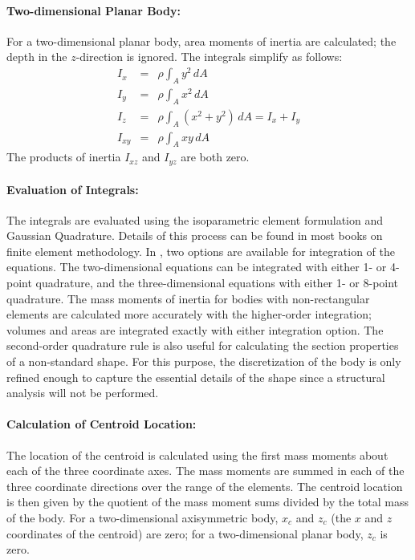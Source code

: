 \paragraph{Two-dimensional Planar Body:}
For a two-dimensional planar body, area moments of inertia are
calculated; the depth in the $z$-direction is ignored. The integrals
simplify as follows:
\begin{eqnarray}
 I_x    &=& \rho\int_A y^2\,dA                   \\
 I_y    &=& \rho\int_A x^2\,dA                   \\
 I_z    &=& \rho\int_A \left(x^2 + y^2\right)\,dA = I_x + I_y \\
 I_{xy} &=& \rho\int_A xy\,dA
\end{eqnarray}
The products of inertia $I_{xz}$ and $I_{yz}$ are both zero.

\paragraph*{Evaluation of Integrals:} The integrals are evaluated using
the isoparametric element formulation and Gaussian Quadrature. Details
of this process can be found in most books on finite element
methodology.  In \numbers, two options are available for integration of
the equations.  The two-dimensional equations can be integrated with
either 1- or 4-point quadrature, and the three-dimensional equations
with either 1- or 8-point quadrature.  The mass moments of inertia for
bodies with non-rectangular elements are calculated more accurately with
the higher-order integration; volumes and areas are integrated exactly
with either integration option.  The second-order quadrature rule is
also useful for calculating the section properties of a non-standard
shape.  For this purpose, the discretization of the body is only refined
enough to capture the essential details of the shape since a structural
analysis will not be performed.

\paragraph{Calculation of Centroid Location:} The location of the
centroid is calculated using the first mass moments about each of the
three coordinate axes.  The mass moments are summed in each of the three
coordinate directions over the range of the elements.  The centroid
location is then given by the quotient of the mass moment sums divided
by the total mass of the body.  For a two-dimensional axisymmetric body,
$x_c$ and $z_c$ (the $x$ and $z$ coordinates of the centroid) are zero;
for a two-dimensional planar body, $z_c$ is zero.

